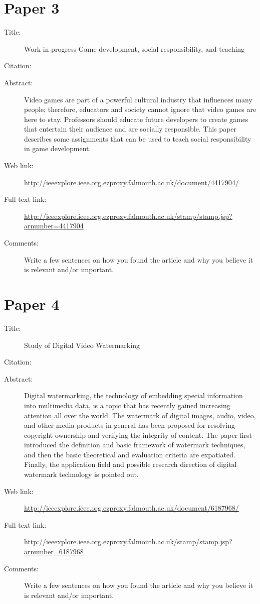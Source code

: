 \documentclass{scrartcl}
\begin{document}
\section*{Paper 3}
\begin{description}
\item[Title:] Work in progress Game development, social responsibility, and teaching
\item[Citation:] \cite{SocialTeaching}
\item[Abstract:] Video games are part of a powerful cultural industry that influences many people; therefore, educators and society cannot ignore that video games are here to stay. Professors should educate future developers to create games that entertain their audience and are socially responsible. This paper describes some assignments that can be used to teach social responsibility in game development.
\item[Web link:] \url{http://ieeexplore.ieee.org.ezproxy.falmouth.ac.uk/document/4417904/}
\item[Full text link:] \url{http://ieeexplore.ieee.org.ezproxy.falmouth.ac.uk/stamp/stamp.jsp?arnumber=4417904}
\item[Comments:] Write a few sentences on how you found the article and why you believe it is relevant and/or important.
\end{description}

\section*{Paper 4}
\begin{description}
\item[Title:] Study of Digital Video Watermarking
\item[Citation:] \cite{DigitalWatermarking}
\item[Abstract:] Digital watermarking, the technology of embedding special information into multimedia data, is a topic that has recently gained increasing attention all over the world. The watermark of digital images, audio, video, and other media products in general has been proposed for resolving copyright ownership and verifying the integrity of content. The paper first introduced the definition and basic framework of watermark techniques, and then the basic theoretical and evaluation criteria are expatiated. Finally, the application field and possible research direction of digital watermark technology is pointed out.
\item[Web link:] \url{http://ieeexplore.ieee.org.ezproxy.falmouth.ac.uk/document/6187968/}
\item[Full text link:] \url{http://ieeexplore.ieee.org.ezproxy.falmouth.ac.uk/stamp/stamp.jsp?arnumber=6187968}
\item[Comments:] Write a few sentences on how you found the article and why you believe it is relevant and/or important.
\end{description}
\end{document}
